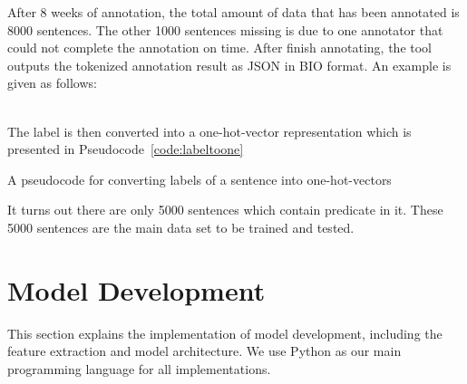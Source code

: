 After 8 weeks of annotation, the total amount of data that has been annotated is 8000 sentences. The other 1000 sentences missing is due to one annotator that could not complete the annotation on time. After finish annotating, the tool outputs the tokenized annotation result as JSON in BIO format. An example is given as follows:

\\

The label is then converted into a one-hot-vector representation which is presented in Pseudocode~\ref{code:labeltoone}
\begin{kode}
	
	
	\caption{A pseudocode for converting labels of a sentence into one-hot-vectors}
	\label{code:labeltoone}
	
\end{kode}

It turns out there are only 5000 sentences which contain predicate in it. These 5000 sentences are the main data set to be trained and tested.

\section{Model Development}
This section explains the implementation of model development, including the feature extraction and model architecture. We use Python as our main programming language for all implementations.

